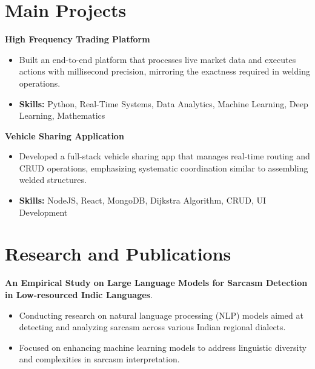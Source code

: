 \documentclass[a4paper,11pt]{article}
\begin{document}
\section{\textbf{Main Projects}}

\vspace{1mm}
  \textbf{High Frequency Trading Platform  }
\vspace{-1.5mm} %
\begin{itemize}
  \item Built an end-to-end platform that processes live market data and executes actions with millisecond precision, mirroring the exactness required in welding operations.
\vspace{-3mm}
  \item \textbf{Skills:} Python, Real-Time Systems, Data Analytics, Machine Learning, Deep Learning, Mathematics
\end{itemize}


\vspace{1mm}
   \textbf{Vehicle Sharing Application }
\vspace{-1.5mm} %
\begin{itemize}
  \item Developed a full-stack vehicle sharing app that manages real-time routing and CRUD operations, emphasizing systematic coordination similar to assembling welded structures.
\vspace{-3mm}
  \item \textbf{Skills:} NodeJS, React, MongoDB, Dijkstra Algorithm, CRUD, UI Development
\end{itemize}



\section{\textbf{Research and Publications} \hfill }
\vspace{1mm}
  \textbf{An Empirical Study on Large Language Models for Sarcasm Detection in Low-resourced Indic Languages}.
\vspace{-1mm} %
\begin{itemize}
  \item Conducting research on natural language processing (NLP) models aimed at detecting and analyzing sarcasm across various Indian regional dialects.
\vspace{-3mm}
  \item Focused on enhancing machine learning models to address linguistic diversity and complexities in sarcasm interpretation.
\end{itemize}
\end{document}
